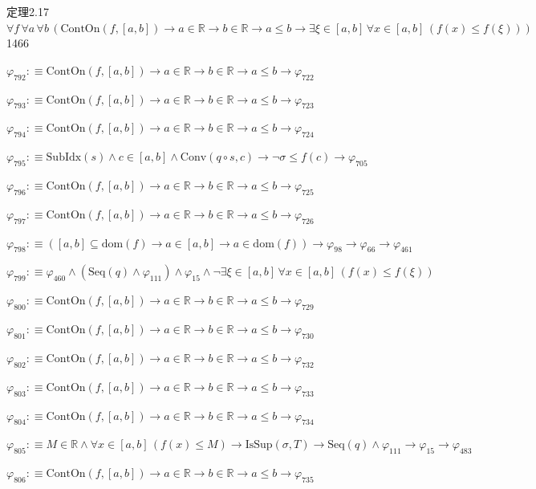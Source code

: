 \begin{fullproof}{定理2.17}{$\forall f\,\forall a\,\forall b\,(\mathrm{ContOn}(f,[a,b]) \to a \in \mathbb{R} \to b \in \mathbb{R} \to a \leq b \to \exists \xi \in [a,b]\,\forall x \in [a,b]\,(f(x) \leq f(\xi)))$}{1466}
\begin{abbrevlist}
\item $\varphi_{792} :\equiv \mathrm{ContOn}(f,[a,b]) \to a \in \mathbb{R} \to b \in \mathbb{R} \to a \leq b \to \varphi_{722}$
\item $\varphi_{793} :\equiv \mathrm{ContOn}(f,[a,b]) \to a \in \mathbb{R} \to b \in \mathbb{R} \to a \leq b \to \varphi_{723}$
\item $\varphi_{794} :\equiv \mathrm{ContOn}(f,[a,b]) \to a \in \mathbb{R} \to b \in \mathbb{R} \to a \leq b \to \varphi_{724}$
\item $\varphi_{795} :\equiv \mathrm{SubIdx}(s) \land c \in [a,b] \land \mathrm{Conv}(q \circ s,c) \to \neg \sigma \leq f(c) \to \varphi_{705}$
\item $\varphi_{796} :\equiv \mathrm{ContOn}(f,[a,b]) \to a \in \mathbb{R} \to b \in \mathbb{R} \to a \leq b \to \varphi_{725}$
\item $\varphi_{797} :\equiv \mathrm{ContOn}(f,[a,b]) \to a \in \mathbb{R} \to b \in \mathbb{R} \to a \leq b \to \varphi_{726}$
\item $\varphi_{798} :\equiv ([a,b] \subseteq \mathrm{dom}(f) \to a \in [a,b] \to a \in \mathrm{dom}(f)) \to \varphi_{98} \to \varphi_{66} \to \varphi_{461}$
\item $\varphi_{799} :\equiv \varphi_{460} \land (\mathrm{Seq}(q) \land \varphi_{111}) \land \varphi_{15} \land \neg \exists \xi \in [a,b]\,\forall x \in [a,b]\,(f(x) \leq f(\xi))$
\item $\varphi_{800} :\equiv \mathrm{ContOn}(f,[a,b]) \to a \in \mathbb{R} \to b \in \mathbb{R} \to a \leq b \to \varphi_{729}$
\item $\varphi_{801} :\equiv \mathrm{ContOn}(f,[a,b]) \to a \in \mathbb{R} \to b \in \mathbb{R} \to a \leq b \to \varphi_{730}$
\item $\varphi_{802} :\equiv \mathrm{ContOn}(f,[a,b]) \to a \in \mathbb{R} \to b \in \mathbb{R} \to a \leq b \to \varphi_{732}$
\item $\varphi_{803} :\equiv \mathrm{ContOn}(f,[a,b]) \to a \in \mathbb{R} \to b \in \mathbb{R} \to a \leq b \to \varphi_{733}$
\item $\varphi_{804} :\equiv \mathrm{ContOn}(f,[a,b]) \to a \in \mathbb{R} \to b \in \mathbb{R} \to a \leq b \to \varphi_{734}$
\item $\varphi_{805} :\equiv M \in \mathbb{R} \land \forall x \in [a,b]\,(f(x) \leq M) \to \mathrm{IsSup}(\sigma,T) \to \mathrm{Seq}(q) \land \varphi_{111} \to \varphi_{15} \to \varphi_{483}$
\item $\varphi_{806} :\equiv \mathrm{ContOn}(f,[a,b]) \to a \in \mathbb{R} \to b \in \mathbb{R} \to a \leq b \to \varphi_{735}$

\end{abbrevlist}
\end{fullproof}
